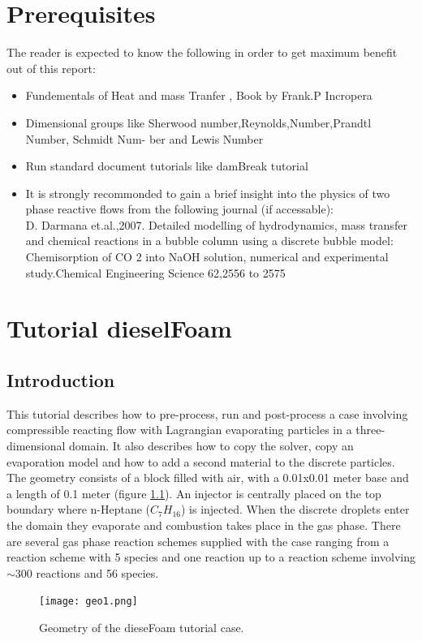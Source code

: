 \documentclass{report}
\begin{document}
\chapter*{Prerequisites}

The reader is expected to know the following in order to get maximum benefit out of this report:
\begin{itemize}
\item Fundementals of Heat and mass Tranfer , Book by Frank.P Incropera
\item Dimensional groups like Sherwood number,Reynolds,Number,Prandtl Number, Schmidt Num-
ber and Lewis Number
\item Run standard document tutorials like damBreak tutorial
\item It is strongly recommonded to gain a brief insight into the physics of two phase reactive flows
from the following journal (if accessable):\\
D. Darmana et.al.,2007. Detailed modelling of hydrodynamics, mass transfer and chemical
reactions in a bubble column using a discrete bubble model: Chemisorption of CO 2 into NaOH
solution, numerical and experimental study.Chemical Engineering Science 62,2556 to 2575
\end{itemize}

\tableofcontents

\chapter{Tutorial dieselFoam}

\section{Introduction}

This tutorial describes how to pre-process, run and post-process a case involving compressible reacting flow with Lagrangian evaporating particles in a three-dimensional domain. It also describes how to copy the solver, copy an evaporation model and how to add a second material to the discrete particles. 
\newline \newline
The geometry consists of a block filled with air, with a 0.01x0.01 meter base and a length of 0.1 meter (figure \ref{geo1}). An injector is centrally placed on the top boundary where n-Heptane ($C_7H_{16}$) is injected. When the discrete droplets enter the domain they evaporate and combustion takes place in the gas phase. There are several gas phase reaction schemes supplied with the case  ranging from a reaction scheme with 5 species and one reaction up to a reaction scheme involving $\sim$300 reactions and 56 species.    
\begin{figure}[h]
  \centering
  \texttt{[image: geo1.png]}
  \setcaptionwidth{14cm}
  \caption{Geometry of the dieseFoam tutorial case.}
  \label{geo1}
\end{figure}
\newpage
\end{document}

